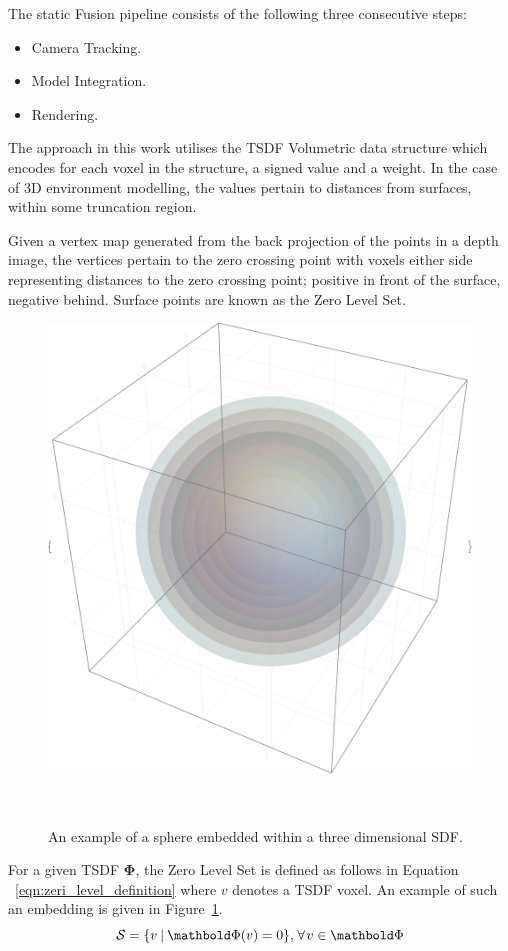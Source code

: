 The static Fusion pipeline consists of the following three consecutive steps:
\begin{itemize}
  \item Camera Tracking.
  \item Model Integration.
  \item Rendering.
\end{itemize}

The approach in this work utilises the TSDF Volumetric data structure which
encodes for each voxel in the structure, a signed value and a weight.
In the case of 3D environment modelling, the values pertain to distances from
surfaces, within some truncation region.

Given a vertex map generated from the back projection of the points in a depth
image, the vertices pertain to the zero crossing point with voxels either side
representing distances to the zero crossing point; positive in front of the
surface, negative behind. Surface points are known as the Zero Level Set.
\begin{figure}[!htbp]
  \centering
  \includegraphics[width=.6\linewidth]{figures/moseg/3d_sdf.eps}
  \caption[Signed Distance Function]{An example of a sphere embedded within a 
  three dimensional SDF.}
~\label{figure:sdf_example}
\end{figure}

For a given TSDF \(\bm{\Phi}\), the Zero Level Set is defined as follows in Equation
~\ref{eqn:zeri_level_definition} where \(v\) denotes a TSDF voxel. An example of such an 
embedding is given in Figure~\ref{figure:sdf_example}.
\begin{equation}
  \label{eqn:zero_level_definition}
  \mathcal{S} = \{v \given \bm{\Phi}(v) = 0\}, 
  \mkern2mu \forall \mkern2mu v \in \bm{\Phi}
\end{equation}

